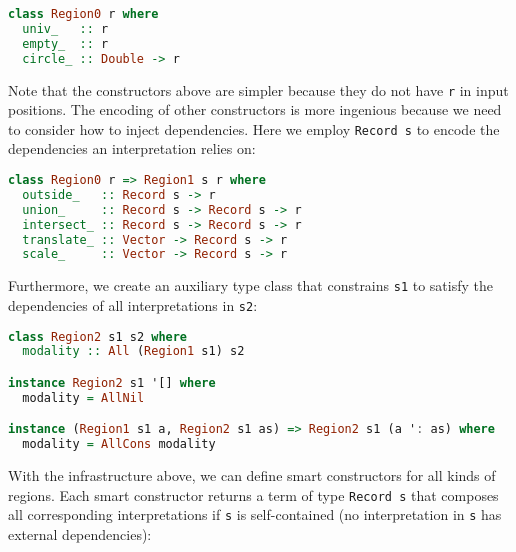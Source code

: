\begin{lstlisting}[language=Haskell]
class Region0 r where
  univ_   :: r
  empty_  :: r
  circle_ :: Double -> r
\end{lstlisting}
\noindent
Note that the constructors above are simpler because they do not have
\lstinline!r! in input positions. The encoding of other
constructors is more ingenious because we need to consider how to inject
dependencies. Here we employ \lstinline!Record s! to
encode the dependencies an interpretation relies on:

\begin{lstlisting}[language=Haskell]
class Region0 r => Region1 s r where
  outside_   :: Record s -> r
  union_     :: Record s -> Record s -> r
  intersect_ :: Record s -> Record s -> r
  translate_ :: Vector -> Record s -> r
  scale_     :: Vector -> Record s -> r
\end{lstlisting}
\noindent
Furthermore, we create an auxiliary type class that constrains
\lstinline!s1! to satisfy the dependencies of all
interpretations in \lstinline!s2!:

\begin{lstlisting}[language=Haskell]
class Region2 s1 s2 where
  modality :: All (Region1 s1) s2

instance Region2 s1 '[] where
  modality = AllNil

instance (Region1 s1 a, Region2 s1 as) => Region2 s1 (a ': as) where
  modality = AllCons modality
\end{lstlisting}
\noindent
With the infrastructure above, we can define smart constructors for all
kinds of regions. Each smart constructor returns a term of type
\lstinline!Record s! that composes all corresponding
interpretations if \lstinline!s! is self-contained (no
interpretation in \lstinline!s! has external
dependencies):

